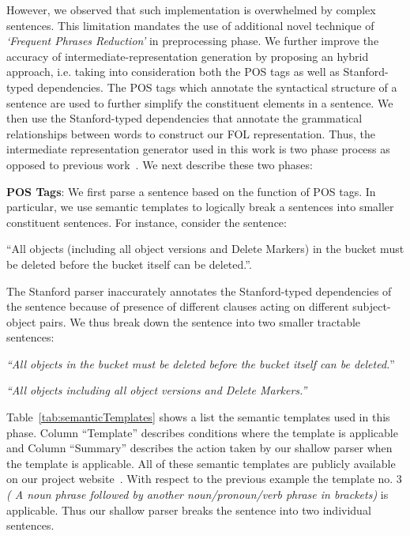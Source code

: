 However, we observed that such implementation is overwhelmed by complex sentences.
This limitation mandates the use of additional novel technique of \textit{`Frequent Phrases Reduction'} in preprocessing phase.
We further improve the accuracy of intermediate-representation generation by proposing an hybrid approach, i.e. taking into consideration both the POS tags as well as Stanford-typed dependencies.
The POS tags which annotate the syntactical structure of a sentence are used to further simplify the constituent elements in a sentence. 
We then use the Stanford-typed dependencies that annotate the grammatical relationships between words to construct our FOL representation.
Thus, the intermediate representation generator used in this work is two phase process as opposed to previous work~\cite{pandita12:inferring, pandita13:WHYPER}. 
We next describe these two phases:

\textbf{POS Tags}: We first parse a sentence based on the function of POS tags. 
In particular, we use semantic templates to logically break a sentences into smaller constituent sentences. 
For instance, consider the sentence:

\begin{center}
\scriptsize``All objects (including all object versions and Delete Markers) in the bucket must be deleted before the bucket itself can be deleted.''. \normalsize
\end{center}

The Stanford parser inaccurately annotates the Stanford-typed dependencies of the sentence because of presence of different clauses acting on different subject-object pairs.
We thus break down the sentence into two smaller tractable sentences:

\begin{center}
\scriptsize \textit{``All objects in the bucket must be deleted before the bucket itself can be deleted.}''
	
\textit{``All objects including all object versions and Delete Markers.''}\normalsize 
\end{center} 


Table~\ref{tab:semanticTemplates} shows a list the semantic templates used in this phase.
Column ``Template'' describes conditions where the template is applicable and Column ``Summary'' describes the action taken by our shallow parser when the template is applicable.
All of these semantic templates are publicly available on our project website~\cite{projectweb}.
With respect to the previous example the template no. 3 \textit{( A noun phrase followed by another noun/pronoun/verb phrase in brackets)} is applicable.
Thus our shallow parser breaks the sentence into two individual sentences.
	 
